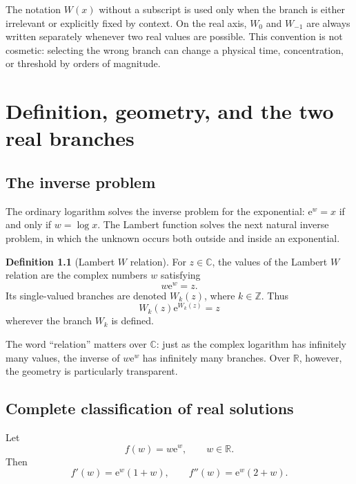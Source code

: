 \documentclass[11pt,oneside]{book}
\theoremstyle{definition}
\newtheorem{definition}[theorem]{Definition}
\theoremstyle{remark}
\newcommand{\ee}{\mathrm e}
\newcommand{\R}{\mathbb R}
\newcommand{\C}{\mathbb C}
\newcommand{\Z}{\mathbb Z}
\begin{document}
The notation $W(x)$ without a subscript is used only when the branch is either
irrelevant or explicitly fixed by context.  On the real axis, $W_0$ and
$W_{-1}$ are always written separately whenever two real values are possible.
This convention is not cosmetic: selecting the wrong branch can change a
physical time, concentration, or threshold by orders of magnitude.

\mainmatter

\chapter{Definition, geometry, and the two real branches}\label{ch:def}

\section{The inverse problem}

The ordinary logarithm solves the inverse problem for the exponential:
$\ee^w=x$ if and only if $w=\log x$.  The Lambert function solves the next
natural inverse problem, in which the unknown occurs both outside and inside
an exponential.

\begin{definition}[Lambert $W$ relation]
For $z\in\C$, the values of the Lambert $W$ relation are the complex numbers
$w$ satisfying
\begin{equation}\label{eq:defining}
  w\ee^w=z.
\end{equation}
Its single-valued branches are denoted $W_k(z)$, where $k\in\Z$.  Thus
\begin{equation}\label{eq:branchdef}
  W_k(z)\ee^{W_k(z)}=z
\end{equation}
wherever the branch $W_k$ is defined.
\end{definition}

The word ``relation'' matters over $\C$: just as the complex logarithm has
infinitely many values, the inverse of $w\ee^w$ has infinitely many branches.
Over $\R$, however, the geometry is particularly transparent.

\section{Complete classification of real solutions}

Let
\[
  f(w)=w\ee^w,\qquad w\in\R.
\]
Then
\begin{equation}\label{eq:fderivatives}
  f'(w)=\ee^w(1+w),\qquad f''(w)=\ee^w(2+w).
\end{equation}
\end{document}

